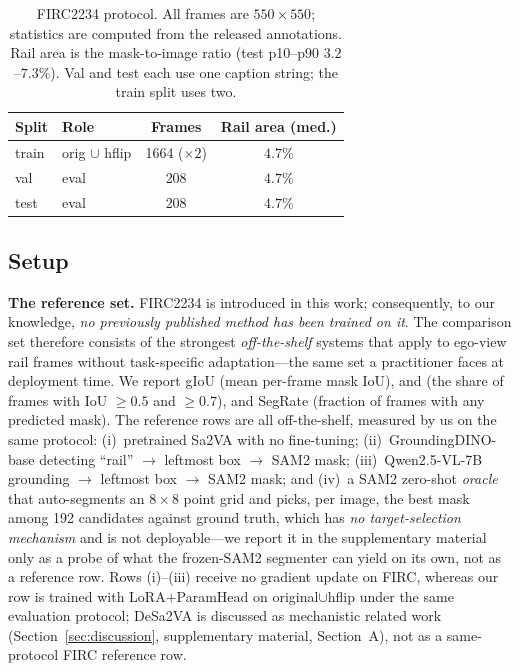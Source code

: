\begin{table}[t]
\centering
\small
\setlength{\tabcolsep}{4pt}
\caption{FIRC2234 protocol. All frames are $550{\times}550$; statistics are computed from the released annotations. Rail area is the mask-to-image ratio (test p10--p90 $3.2$--$7.3\%$). Val and test each use one caption string; the train split uses two.}
\label{tab:data}
\begin{tabularx}{\columnwidth}{@{}lYcc@{}}
\toprule
Split & Role & Frames & Rail area (med.) \\
\midrule
train & orig $\cup$ hflip & 1664 ($\times2$) & $4.7\%$ \\
val & eval & 208 & $4.7\%$ \\
test & eval & 208 & $4.7\%$ \\
\bottomrule
\end{tabularx}
\end{table}

\subsection{Setup}
\label{sec:setup}

\textbf{The reference set.}
FIRC2234 is introduced in this work; consequently, to our knowledge, \emph{no previously published method has been trained on it}.
The comparison set therefore consists of the strongest \emph{off-the-shelf} systems that apply to ego-view rail frames without task-specific adaptation---the same set a practitioner faces at deployment time.
We report gIoU (mean per-frame mask IoU),  and  (the share of frames with IoU ${\ge}0.5$ and ${\ge}0.7$), and SegRate (fraction of frames with any predicted mask).
The reference rows are all off-the-shelf, measured by us on the same protocol: (i)~pretrained Sa2VA \citep{zhang2025sa2va} with no fine-tuning; (ii)~GroundingDINO-base \citep{liu2024groundingdino} detecting ``rail'' $\rightarrow$ leftmost box $\rightarrow$ SAM2 \citep{ravi2024sam2} mask; (iii)~Qwen2.5-VL-7B \citep{bai2025qwen2vl} grounding $\rightarrow$ leftmost box $\rightarrow$ SAM2 mask; and (iv)~a SAM2 zero-shot \emph{oracle} that auto-segments an $8{\times}8$ point grid and picks, per image, the best mask among 192 candidates against ground truth, which has \emph{no target-selection mechanism} and is not deployable---we report it in the supplementary material only as a probe of what the frozen-SAM2 segmenter can yield on its own, not as a reference row.
Rows (i)--(iii) receive no gradient update on FIRC, whereas our row is trained with LoRA$+$ParamHead on original$\cup$hflip under the same evaluation protocol; DeSa2VA \citep{dang2025desa2va} is discussed as mechanistic related work (Section~\ref{sec:discussion}, supplementary material, Section~A), not as a same-protocol FIRC reference row.

